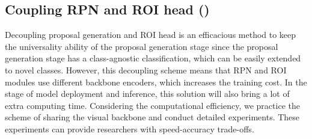 \documentclass[sigconf]{acmart}
\begin{document}
\subsection{Coupling RPN and ROI head ()}
\label{two-way-distillation}
Decoupling proposal generation and ROI head is an efficacious method to keep the universality ability of the proposal generation stage since the proposal generation stage has a class-agnostic classification, which can be easily extended to novel classes. However, this decoupling scheme means that RPN and ROI modules use different backbone encoders, which increases the training cost. In the stage of model deployment and inference, this solution will also bring a lot of extra computing time. Considering the computational efficiency, we practice the scheme of sharing the visual backbone and conduct detailed experiments. These experiments can provide researchers with speed-accuracy trade-offs.

\begin{table*}[t]
\caption{}
      \centering
      \label{sota-coco}
\end{table*}
\end{document}
